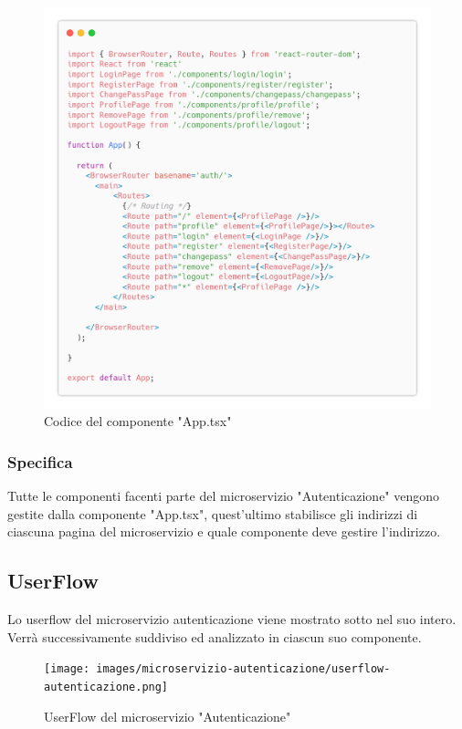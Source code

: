 \documentclass{report}
\begin{document}
\begin{figure}[H]
	\centering\includegraphics[width=1\textwidth]{images/microservizio-autenticazione/frontend/app-carbon.png}
	Codice del componente "App.tsx"
\end{figure}
\subsubsection*{Specifica}
Tutte le componenti facenti parte del microservizio "Autenticazione" vengono gestite dalla componente "App.tsx", quest'ultimo stabilisce gli indirizzi di ciascuna pagina del microservizio e quale componente deve gestire l'indirizzo. 

\subsection{UserFlow}
Lo userflow del microservizio autenticazione viene mostrato sotto nel suo intero. Verrà successivamente suddiviso ed analizzato in ciascun suo componente.
\begin{figure}[H]
	\centering\texttt{[image: images/microservizio-autenticazione/userflow-autenticazione.png]}
	\caption{UserFlow del microservizio "Autenticazione"}
\end{figure}
\end{document}
